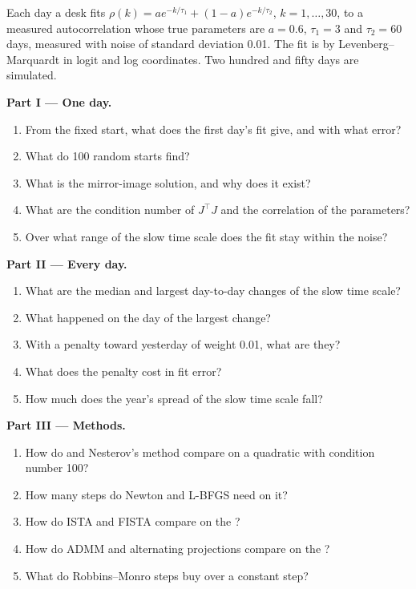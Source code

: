 \begin{problem}\label{pb:qm:numerical-optimisation-in-practice:1}
Each day a desk fits $\rho(k) = a e^{-k/\tau_1} + (1 - a)e^{-k/\tau_2}$, $k = 1, \dots, 30$, to a measured autocorrelation whose true parameters are $a = 0.6$, $\tau_1 = 3$ and $\tau_2 = 60$ days, measured
with noise of standard deviation 0.01. The fit is by Levenberg--Marquardt in logit and log coordinates. Two hundred and fifty days are simulated.

\medskip\noindent\textbf{Part I --- One day.}
\begin{enumerate}
\item From the fixed start, what does the first day's fit give, and with what error?
\item What do 100 random starts find?
\item What is the mirror-image solution, and why does it exist?
\item What are the condition number of $J^\top J$ and the correlation of the parameters?
\item Over what range of the slow time scale does the fit stay within the noise?
\end{enumerate}

\medskip\noindent\textbf{Part II --- Every day.}
\begin{enumerate}[resume]
\item What are the median and largest day-to-day changes of the slow time scale?
\item What happened on the day of the largest change?
\item With a penalty toward yesterday of weight 0.01, what are they?
\item What does the penalty cost in fit error?
\item How much does the year's spread of the slow time scale fall?
\end{enumerate}

\medskip\noindent\textbf{Part III --- Methods.}
\begin{enumerate}[resume]
\item How do  and Nesterov's method compare on a quadratic with condition number 100?
\item How many steps do Newton and L-BFGS need on it?
\item How do ISTA and FISTA compare on the ?
\item How do ADMM and alternating projections compare on the ?
\item What do Robbins--Monro steps buy over a constant step?
\end{enumerate}


\end{problem}

